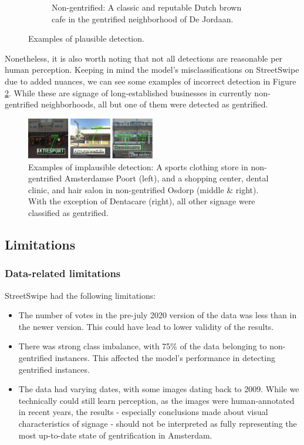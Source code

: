 \begin{figure}[h]
\begin{subfigure}[b]{0.22\textwidth}
        \caption{Non-gentrified: A classic and reputable Dutch brown cafe in the gentrified neighborhood of De Jordaan.}
    \end{subfigure}
    \caption{Examples of plausible detection.}
    \label{fig:detect_ex}
\end{figure}

Nonetheless, it is also worth noting that not all detections are reasonable per human perception. Keeping in mind the model's misclassifications on StreetSwipe due to added nuances, we can see some examples of incorrect detection in Figure \ref{fig:detect_inc_ex}. While these are signage of long-established businesses in currently non-gentrified neighborhoods, all but one of them were detected as gentrified.

\begin{figure}[H]
    \centering
    \includegraphics[width=0.5\textwidth]{media/results/detect/detect_inc_ex.jpg}
    \caption{Examples of implausible detection: A sports clothing store in non-gentrified Amsterdamse Poort (left), and a shopping center, dental clinic, and hair salon in non-gentrified Osdorp (middle \& right). With the exception of Dentacare (right), all other signage were classified as gentrified.}
    \label{fig:detect_inc_ex}
\end{figure}

\subsection{Limitations}
\subsubsection{Data-related limitations}

StreetSwipe had the following limitations: 
\begin{itemize}
    \item The number of votes in the pre-july 2020 version of the data was less than in the newer version. This could have lead to lower validity of the results.
    \item There was strong class imbalance, with 75\% of the data belonging to non-gentrified instances. This affected the model's performance in detecting gentrified instances.
    \item The data had varying dates, with some images dating back to 2009. While we technically could still learn perception, as the images were human-annotated in recent years, the results - especially conclusions made about visual characteristics of signage - should not be interpreted as fully representing the most up-to-date state of gentrification in Amsterdam.
\end{itemize}

